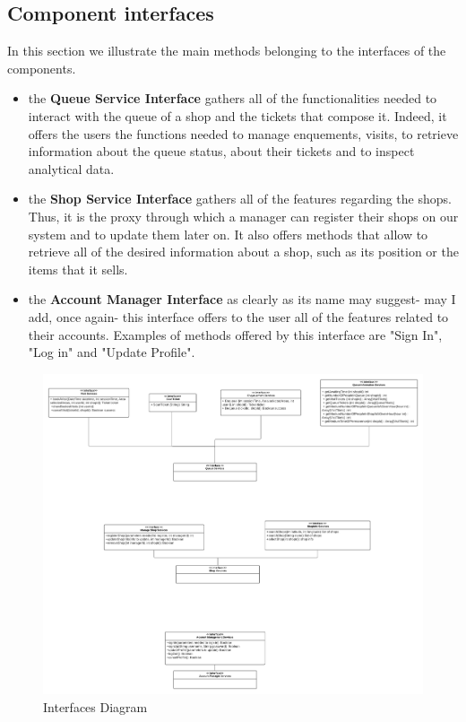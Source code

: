 \subsection{Component interfaces}
\label{subsect:componentinterfaces}

In this section we illustrate the main methods belonging to the interfaces of the components.
\begin{itemize}
    \item the \textbf{Queue Service Interface} gathers all of the functionalities needed to interact with the queue of a shop and the tickets that compose it. 
    Indeed, it offers the users the functions needed to manage enquements, visits, to retrieve information about the queue status, about their tickets and to inspect analytical data.
    \item the \textbf{Shop Service Interface} gathers all of the features regarding the shops. Thus, it is the proxy through which a manager can register their shops on our system and to update them later on. It also offers methods that allow to retrieve all of the desired information about a shop, such as its position or the items that it sells.
    \item the \textbf{Account Manager Interface} as clearly as its name may suggest- may I add, once again- this interface offers to the user all of the features related to their accounts. Examples of methods offered by this interface are "Sign In", "Log in" and "Update Profile".
\end{itemize}

\begin{figure}[h!]
    \centering
    \includegraphics[width=1\textwidth]{Images/InterfacesDiagram.png}
    \caption{\label{fig:InterfacesDiagram}{Interfaces Diagram}}
    
    

    
\end{figure}

